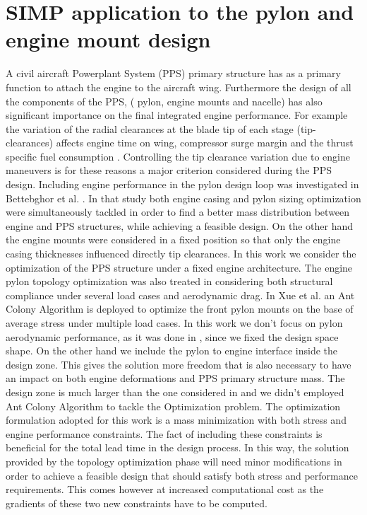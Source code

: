 \section{SIMP application to the pylon and engine mount design}
\label{SIMP_application}
A civil aircraft Powerplant System (PPS) primary structure has as a primary function to attach the engine to the aircraft wing. Furthermore the design of all the components of the PPS, ( pylon, engine mounts and nacelle) has also significant importance on the final integrated engine performance.
For example the variation of the radial clearances at the blade tip of each stage (tip-clearances) affects engine time on wing, compressor surge margin and the thrust specific fuel consumption \cite{lattime2002turbine,benito20083d}. Controlling the tip clearance variation due to engine maneuvers is for these reasons a major criterion considered during the PPS design. Including engine performance in the pylon design loop was investigated in Bettebghor et al. \cite{bettebghor2013bi}. In that study both engine casing and pylon sizing optimization were simultaneously tackled in order to find a better mass distribution between engine and PPS structures, while achieving a feasible design. On the other hand the engine mounts were considered in a fixed position so that only the engine casing thicknesses influenced directly tip clearances.
In this work we consider the optimization of the PPS structure under a fixed engine architecture.
 The engine pylon topology optimization was also treated in \cite{remouchamps2011application} considering both structural compliance under several load cases and aerodynamic drag.
 In Xue et al. \cite{xue2012structural} an Ant Colony Algorithm is deployed to optimize the front pylon mounts on the base of average stress under multiple load cases.
 In this work we don't focus on pylon aerodynamic performance, as it was done in \cite{remouchamps2011application}, since we fixed the design space shape. On the other hand we include the pylon to engine interface inside the design zone. This gives the solution more freedom that is also necessary to have an impact on both engine deformations and PPS primary structure mass. The design zone is much larger than the one considered in \cite{xue2012structural} and we didn't employed Ant Colony Algorithm to tackle the Optimization problem.
 The optimization formulation adopted for this work is a mass minimization with both stress and engine performance constraints. The fact of including these constraints is beneficial for the total lead time in the design process. In this way, the solution provided by the topology optimization phase will need minor modifications in order to achieve a feasible design that should satisfy both stress and performance requirements. This comes however at increased computational cost as the gradients of these two new constraints have to be computed.\\
